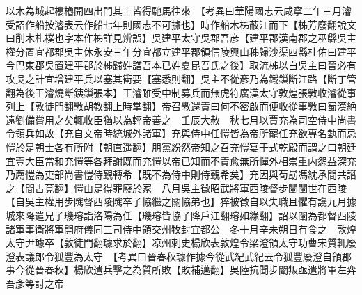 以木為城起樓櫓開四出門其上皆得馳馬往來　【考異曰華陽國志云咸寧二年三月濬受詔作船按濬表云作船七年則國志不可據也】時作船木柹蔽江而下【柹芳廢翻說文曰削木札樸也字本作柹詳見辨誤】吳建平太守吳郡吾彦【建平郡漢南郡之巫縣吳主權分置宜都郡吳主休永安三年分宜都立建平郡領信陵興山秭歸沙渠四縣杜佑曰建平今巴東郡吳置建平郡於柹歸姓譜吾本已姓夏昆吾氏之後】取流柹以白吳主曰晉必有攻吳之計宜增建平兵以塞其衝要【塞悉則翻】吳主不從彥乃為鐵鎻斷江路【斷丁管翻為後王濬燒斷銕鎻張本】王濬雖受中制募兵而無虎符廣漢太守敦煌張斆收濬從事列上【敦徒門翻斆胡教翻上時掌翻】帝召斆還責曰何不密啟而便收從事斆曰蜀漢絶遠劉備嘗用之矣輒收臣猶以為輕帝善之　壬辰大赦　秋七月以賈充為司空侍中尚書令領兵如故【充自文帝時統城外諸軍】充與侍中任愷皆為帝所寵任充欲專名埶而忌愷於是朝士各有所附【朝直遥翻】朋黨紛然帝知之召充愷宴于式乾殿而謂之曰朝廷宜壹大臣當和充愷等各拜謝既而充愷以帝已知而不責愈無所憚外相崇重内怨益深充乃薦愷為吏部尚書愷侍覲轉希【既不為侍中則侍覲希矣】充因與荀勗馮紞承間共譖之【間古莧翻】愷由是得罪廢於家　八月吳主徵昭武將軍西陵督步闡闡世在西陵【自吳主權用步隲督西陵隲卒子協繼之關協弟也】猝被徵自以失職且懼有讒九月據城來降遣兄子璣璿詣洛陽為任【璣璿皆協子降戶江翻璿如緣翻】詔以闡為都督西陵諸軍事衛將軍開府儀同三司侍中領交州牧封宜都公　冬十月辛未朔日有食之　敦煌太守尹璩卒【敦徒門翻璩求於翻】凉州刺史楊欣表敦煌令梁澄領太守功曹宋質輒廢澄表議郎令狐豐為太守　【考異曰晉春秋璩作據今從武紀武紀云令狐豐廢澄自領郡事今從晉春秋】楊欣遣兵擊之為質所敗【敗補邁翻】吳陸抗聞步闡叛亟遣將軍左弈吾彥等討之帝

